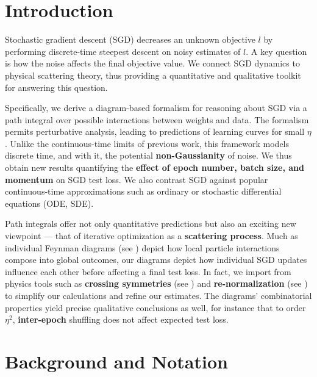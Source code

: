 \documentclass{article}
\begin{document}
\section{Introduction}
    Stochastic gradient descent (SGD) decreases an unknown objective $l$ by
    performing discrete-time steepest descent on noisy estimates of $l$.  A key
    question is how the noise affects the final objective value.  We connect
    SGD dynamics to physical scattering theory, thus providing a quantitative
    and qualitative toolkit for answering this question.

    Specifically, we derive a diagram-based formalism for reasoning about SGD
    via a path integral over possible interactions between weights and data.
    The formalism permits perturbative analysis, leading to predictions of
    learning curves for small $\eta$.  Unlike the continuous-time limits of
    previous work, this framework models discrete time, and with it, the
    potential {\bf non-Gaussianity} of noise.  We thus obtain new results
    quantifying the {\bf effect of epoch number, batch size, and momentum} on
    SGD test loss.  We also contrast SGD against popular continuous-time
    approximations such as ordinary or stochastic differential equations (ODE,
    SDE).
    
    Path integrals offer not only quantitative predictions but also an exciting
    new viewpoint --- that of iterative optimization as a {\bf scattering
    process}.  Much as individual Feynman diagrams (see \citet{dy49a}) depict
    how local particle interactions compose into global outcomes, our diagrams
    depict how individual SGD updates influence each other before affecting a
    final test loss.  In fact, we import from physics tools such as {\bf
    crossing symmetries} (see \citet{dy49b}) and {\bf re-normalization} (see
    \citet{ge54}) to simplify our calculations and refine our estimates.  The
    diagrams' combinatorial properties yield precise qualitative conclusions as
    well, for instance that to order $\eta^2$, {\bf inter-epoch} shuffling does
    not affect expected test loss.



\section{Background and Notation}
\end{document}
